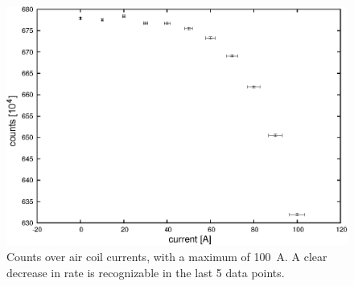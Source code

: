   \begin{figure}

  \centering
  	\includegraphics[width = 0.9 \textwidth]{graphics/aircoilCounts/aircoilsCountsCurrent.eps}
  	\caption[Rate dependence on magnetic fields]{Counts over air coil currents, with a maximum of \SI{100}{\ampere}. A clear decrease in rate is recognizable in the last 5 data points.}
  	\label{fig:aircoilCountsCurrent}
  \end{figure}
  

